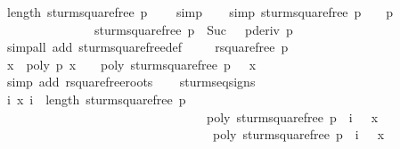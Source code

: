 \begin{isabellebody}
\ {\isachardoublequoteopen}length\ {\isacharparenleft}sturm{\isacharunderscore}squarefree\ p{\isacharparenright}\ {\isasymge}\ {}{\isachardoublequoteclose}\ \isamarkupfalse%
\ simp\isanewline
\isanewline
\ \ \isamarkupfalse%
\ {\isacharbrackleft}simp{\isacharbrackright}{\isacharcolon}\ {\isachardoublequoteopen}sturm{\isacharunderscore}squarefree\ p\ {\isacharbang}\ {}\ {\isacharequal}\ p{\isacharprime}{\isachardoublequoteclose}\ \isanewline
\ \ \ \ \ \ \ \ \ \ \ \ \ \ \ {\isachardoublequoteopen}sturm{\isacharunderscore}squarefree\ p\ {\isacharbang}\ Suc\ {}\ {\isacharequal}\ pderiv\ p{\isacharprime}{\isachardoublequoteclose}\ \isanewline
\ \ \ \ \ \ \isamarkupfalse%
\ {\isacharparenleft}simp{\isacharunderscore}all\ add{\isacharcolon}\ sturm{\isacharunderscore}squarefree{\isacharunderscore}def{\isacharparenright}\ \isanewline
\isanewline
\ \ \isamarkupfalse%
\ {\isacharbackquoteopen}rsquarefree\ p{\isacharprime}{\isacharbackquoteclose}\ \isanewline
\ \ \ \ \ \ \isamarkupfalse%
\ {\isachardoublequoteopen}{\isasymAnd}x{\isachardot}\ {\isasymnot}\ {\isacharparenleft}poly\ p{\isacharprime}\ x\ {\isacharequal}\ {}\ {\isasymand}\ poly\ {\isacharparenleft}sturm{\isacharunderscore}squarefree\ p\ {\isacharbang}\ {}{\isacharparenright}\ x\ {\isacharequal}\ {}{\isacharparenright}{\isachardoublequoteclose}\isanewline
\ \ \ \ \ \ \isamarkupfalse%
\ {\isacharparenleft}simp\ add{\isacharcolon}\ rsquarefree{\isacharunderscore}roots{\isacharparenright}\isanewline
\isanewline
\ \ \isamarkupfalse%
\ sturm{\isacharunderscore}seq{\isachardot}signs\ \isamarkupfalse%
\ {\isachardoublequoteopen}{\isasymAnd}i\ x{\isachardot}\ {\isasymlbrakk}i\ {\isacharless}\ length\ {\isacharparenleft}sturm{\isacharunderscore}squarefree\ p{\isacharparenright}\ {\isacharminus}\ {}{\isacharsemicolon}\isanewline
\ \ \ \ \ \ \ \ \ \ \ \ \ \ \ \ \ \ \ \ \ \ \ \ \ \ \ \ \ \ \ \ \ poly\ {\isacharparenleft}sturm{\isacharunderscore}squarefree\ p\ {\isacharbang}\ {\isacharparenleft}i\ {\isacharplus}\ {}{\isacharparenright}{\isacharparenright}\ x\ {\isacharequal}\ {}{\isasymrbrakk}\isanewline
\ \ \ \ \ \ \ \ \ \ \ \ \ \ \ \ \ \ \ \ \ \ \ \ \ \ \ \ \ \ \ \ \ {\isasymLongrightarrow}\ poly\ {\isacharparenleft}sturm{\isacharunderscore}squarefree\ p\ {\isacharbang}\ {\isacharparenleft}i\ {\isacharplus}\ {}{\isacharparenright}{\isacharparenright}\ x\ {\isacharasterisk}\isanewline

\end{isabellebody}
